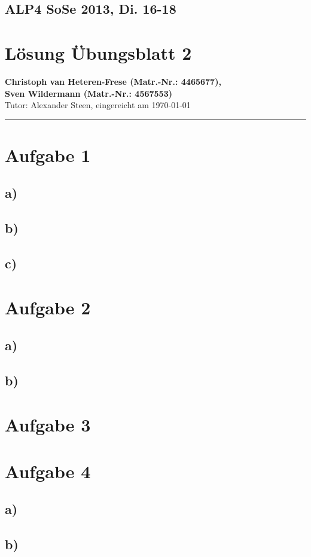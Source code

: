 \documentclass[11pt,a4paper,DIV=10,]{scrartcl}
\begin{document}
\onecolumn
\subsection*{ALP4 SoSe 2013, Di. 16-18}
\section*{Lösung Übungsblatt 2}
\textbf{Christoph van Heteren-Frese (Matr.-Nr.: 4465677), \\ Sven Wildermann (Matr.-Nr.: 4567553)}\\
Tutor: Alexander Steen, eingereicht am \today\\
\hrule

\section*{Aufgabe 1}
\subsection*{a)}
\subsection*{b)}
\subsection*{c)}
\section*{Aufgabe 2}
\subsection*{a)}
\subsection*{b)}

\section*{Aufgabe 3}

\section*{Aufgabe 4}
\subsection*{a)}
\subsection*{b)}
\end{document}
